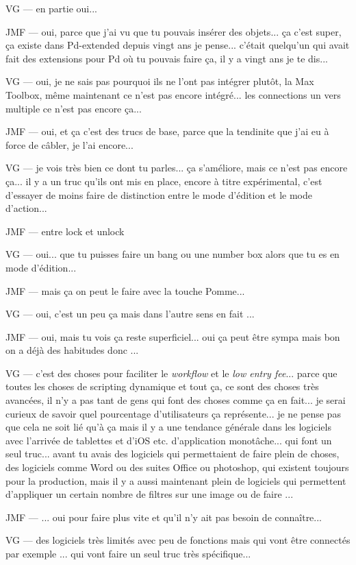 VG — en partie oui... 

JMF — oui, parce que j'ai vu que tu pouvais insérer des objets... ça c'est super, ça existe dans Pd-extended depuis vingt ans je pense... c'était quelqu'un qui avait fait des extensions pour Pd où tu pouvais faire ça, il y a vingt ans je te dis...  

VG — oui, je ne sais pas pourquoi ils ne l'ont pas intégrer plutôt, la Max Toolbox, même maintenant ce n'est pas encore intégré... les connections un vers multiple ce n'est pas encore ça... 

JMF — oui, et ça c'est des trucs de base, parce que la tendinite que j'ai eu à force de câbler, je l'ai encore...  

VG — je vois très bien ce dont tu parles... ça s'améliore, mais ce n'est pas encore ça... il y a un truc qu'ils ont mis en place, encore à titre expérimental, c'est d'essayer de moins faire de distinction entre le mode d'édition et le mode d'action...  

JMF — entre lock et unlock 

VG — oui... que tu puisses faire un bang ou une number box alors que tu es en mode d'édition... 

JMF — mais ça on peut le faire avec la touche Pomme... 

VG — oui, c'est un peu ça mais dans l'autre sens en fait ... 

JMF — oui, mais tu vois ça reste superficiel... oui ça peut être sympa mais bon on a déjà des habitudes donc ... 

VG — c'est des choses pour faciliter le \textit{workflow} et le \textit{low entry fee}... parce que toutes les choses de scripting dynamique et tout ça, ce sont des choses très avancées, il n'y a pas tant de gens qui font des choses comme ça en fait... je serai curieux de savoir quel pourcentage d'utilisateurs ça représente... je ne pense pas que cela ne soit lié qu'à ça mais il y a une tendance générale dans les logiciels avec l'arrivée de tablettes et d'iOS etc. d'application monotâche... qui font un seul truc... avant tu avais des logiciels qui permettaient de faire plein de choses, des logiciels comme Word ou des suites Office ou photoshop, qui existent toujours pour la production, mais il y a aussi maintenant plein de logiciels qui permettent d'appliquer un certain nombre de filtres sur une image ou de faire ... 

JMF — ... oui pour faire plus vite et qu'il n'y ait pas besoin de connaître... 

VG — des logiciels très limités avec peu de fonctions mais qui vont être connectés par exemple ... qui vont faire un seul truc très spécifique... 


